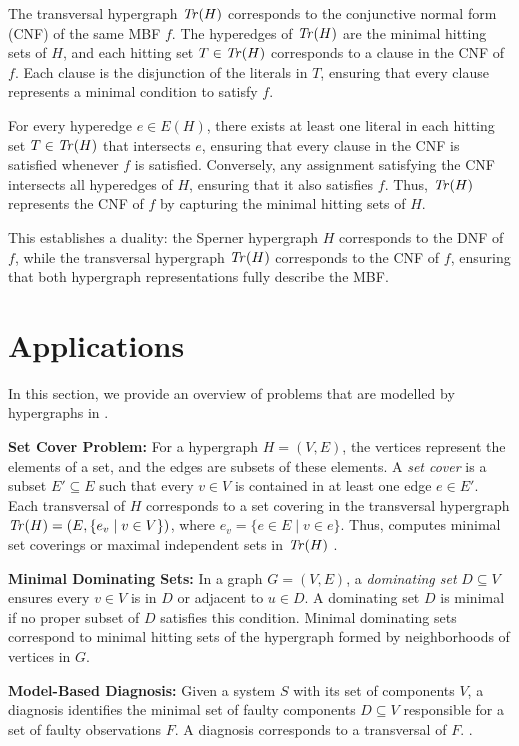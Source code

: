 The transversal hypergraph $\mathit{Tr}(H)$ corresponds to the conjunctive normal form (CNF) of the same MBF $f$. The hyperedges of $\mathit{Tr}(H)$ are the minimal hitting sets of $H$, and each hitting set $T\in\mathit{Tr}(H)$ corresponds to a clause in the CNF of $f$. Each clause is the disjunction of the literals in $T$, ensuring that every clause represents a minimal condition to satisfy $f$.

For every hyperedge $e\in E(H)$, there exists at least one literal in each hitting set $T\in\mathit{Tr}(H)$ that intersects $e$, ensuring that every clause in the CNF is satisfied whenever $f$ is satisfied. Conversely, any assignment satisfying the CNF intersects all hyperedges of $H$, ensuring that it also satisfies $f$. Thus, $\mathit{Tr}(H)$ represents the CNF of $f$ by capturing the minimal hitting sets of $H$.

This establishes a duality: the Sperner hypergraph $H$ corresponds to the DNF of $f$, while the transversal hypergraph $\mathit{Tr}(H)$ corresponds to the CNF of $f$, ensuring that both hypergraph representations fully describe the MBF.

\section{Applications}

In this section, we provide an overview of problems that are modelled by hypergraphs in \TransHyp.

\textbf{Set Cover Problem:} For a hypergraph $H=(V,E)$, the vertices represent the elements of a set, and the edges are subsets of these elements. A \emph{set cover} is a subset $E'\subseteq E$ such that every $v\in V$ is contained in at least one edge $e\in E'$. Each transversal of $H$ corresponds to a set covering in the transversal hypergraph $\mathit{Tr}(H)=(E,\{e_v\mid v\in V\})$, where $e_v=\{e\in E\mid v\in e\}$. Thus, \TransHyp{} computes minimal set coverings or maximal independent sets in $\mathit{Tr}(H)$ \cite{EMG08}.

\textbf{Minimal Dominating Sets:} In a graph $G=(V,E)$, a \emph{dominating set} $D\subseteq V$ ensures every $v\in V$ is in $D$ or adjacent to $u\in D$. A dominating set $D$ is minimal if no proper subset of $D$ satisfies this condition. Minimal dominating sets correspond to minimal hitting sets of the hypergraph formed by neighborhoods of vertices in $G$.

\textbf{Model-Based Diagnosis:} Given a system $S$ with its set of components $V$, a diagnosis identifies the minimal set of faulty components $D\subseteq V$ responsible for a set of faulty observations $F$. A diagnosis corresponds to a transversal of $F$. \cite{Rei87}.

